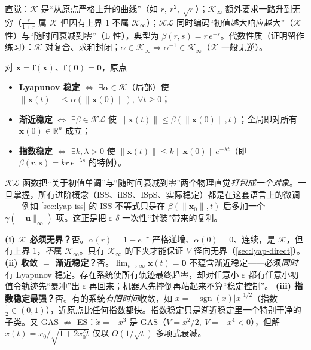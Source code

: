 \noindent 直觉：$\mathcal{K}$ 是“从原点严格上升的曲线”（如 $r,\ r^2,\ \sqrt{r}$）；$\mathcal{K}_\infty$ 额外要求一路升到无穷（$\frac{r}{1+r}$ 属 $\mathcal{K}$ 但因有上界 $1$ 不属 $\mathcal{K}_\infty$）；$\mathcal{KL}$ 同时编码“初值越大响应越大”（$\mathcal{K}$ 性）与“随时间衰减到零”（L 性），典型为 $\beta(r,s)=r\,e^{-s}$。代数性质（证明留作练习）：$\mathcal{K}$ 对复合、求和封闭；$\alpha\in\mathcal{K}_\infty\Rightarrow\alpha^{-1}\in\mathcal{K}_\infty$（$\mathcal{K}$ 一般无逆）。

\begin{theorem}[三级稳定性的比较函数刻画]
\label{thm:lyap-comparison-char}
对 $\dot{\mathbf{x}}=\mathbf{f}(\mathbf{x})$、$\mathbf{f}(\mathbf{0})=\mathbf{0}$，原点
\begin{itemize}
  \item \textbf{Lyapunov 稳定} $\iff$ $\exists\alpha\in\mathcal{K}$（局部）使 $\|\mathbf{x}(t)\|\le\alpha(\|\mathbf{x}(0)\|),\ \forall t\ge0$；
  \item \textbf{渐近稳定} $\iff$ $\exists\beta\in\mathcal{KL}$ 使 $\|\mathbf{x}(t)\|\le\beta(\|\mathbf{x}(0)\|,t)$；全局即对所有 $\mathbf{x}(0)\in\mathbb{R}^n$ 成立；
  \item \textbf{指数稳定} $\iff$ $\exists k,\lambda>0$ 使 $\|\mathbf{x}(t)\|\le k\|\mathbf{x}(0)\|e^{-\lambda t}$（即 $\beta(r,s)=kr\,e^{-\lambda s}$ 的特例）。
\end{itemize}
\end{theorem}

\begin{insight}
$\mathcal{KL}$ 函数把“关于初值单调”与“随时间衰减到零”两个物理直觉\emph{打包成一个对象}。一旦掌握，所有进阶概念（ISS、iISS、ISpS、实际稳定）都是在这套语言上的微调——例如 \cref{sec:lyap-iss} 的 ISS 不等式只是在 $\beta(\|\mathbf{x}_0\|,t)$ 后多加一个 $\gamma(\|\mathbf{u}\|_\infty)$ 项。这正是把 $\varepsilon$-$\delta$ 一次性“封装”带来的复利。
\end{insight}

\begin{pitfall}[三个高频误区]
\textbf{(i) $\mathcal{K}$ 必须无界？}\;否。$\alpha(r)=1-e^{-r}$ 严格递增、$\alpha(0)=0$、连续，是 $\mathcal{K}$，但有上界 $1$，\emph{不}属 $\mathcal{K}_\infty$。只有 $\mathcal{K}_\infty$ 的下夹才能保证 $V$ 径向无界（\cref{sec:lyap-direct}）。
\quad\textbf{(ii) 收敛 $=$ 渐近稳定？}\;否。$\lim_{t\to\infty}\mathbf{x}(t)=\mathbf{0}$ 不蕴含渐近稳定——必须\emph{同时}有 Lyapunov 稳定。存在系统使所有轨迹最终趋零，却对任意小 $\varepsilon$ 都有任意小初值令轨迹先“暴冲”出 $\varepsilon$ 再回来；机器人先摔倒再站起来不算“稳定控制”。
\quad\textbf{(iii) 指数稳定最强？}\;否。有的系统\emph{有限时间}收敛，如 $\dot x=-\operatorname{sgn}(x)|x|^{1/2}$（指数 $\tfrac12\in(0,1)$），近原点比任何指数都快\cite{bhat2000finitetime}。指数稳定只是渐近稳定里一个特别干净的子类。又 GAS $\not\Rightarrow$ ES：$\dot x=-x^3$ 是 GAS（$V=x^2/2,\ \dot V=-x^4<0$），但解 $x(t)=x_0/\sqrt{1+2x_0^2t}$ 仅以 $O(1/\sqrt t)$ 多项式衰减。
\end{pitfall}

